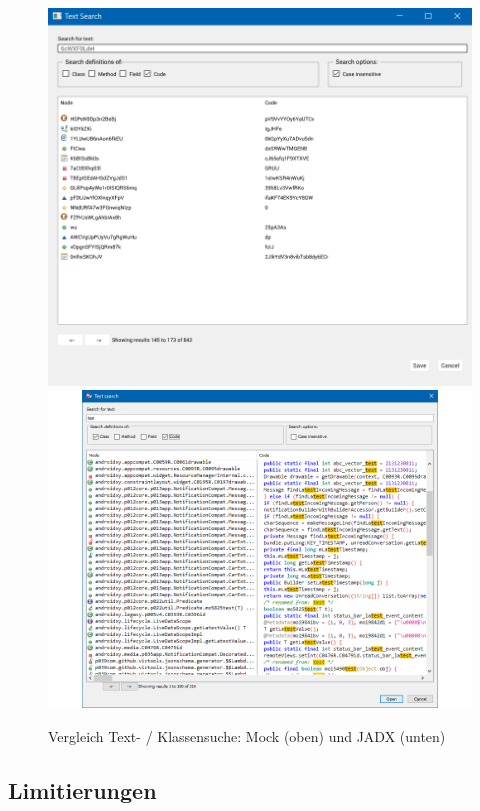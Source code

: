 \begin{figure}[p]
    \centering
    \includegraphics[height=.45\textheight]{bilder/jadx_mock_search.png}
    \includegraphics[height=.45\textheight]{bilder/jadx_search.png}
    \caption{Vergleich Text- / Klassensuche: Mock (oben) und JADX (unten)}
    \label{fig:mock_search_comparison}
\end{figure}





\subsection{Limitierungen}
\label{sec:mock_limitations}



